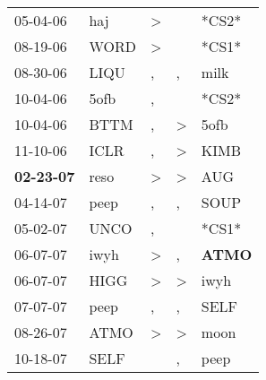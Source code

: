 \begin{supertabular}{p{0.07\textwidth}p{0.06\textwidth}p{0.02\textwidth}p{0.02\textwidth}p{0.06\textwidth}}
          05-04-06\textsuperscript{} &            haj\textsuperscript{} &     \textgreater &                  &                            *CS2* \\
          08-19-06\textsuperscript{} &           WORD\textsuperscript{} &     \textgreater &                  &                            *CS1* \\
          08-30-06\textsuperscript{} &           LIQU\textsuperscript{} &                , &                , &           milk\textsuperscript{} \\
          10-04-06\textsuperscript{} &           5ofb\textsuperscript{} &                , &                  &                            *CS2* \\
          10-04-06\textsuperscript{} &           BTTM\textsuperscript{} &                , &     \textgreater &           5ofb\textsuperscript{} \\
          11-10-06\textsuperscript{} &           ICLR\textsuperscript{} &                , &     \textgreater &           KIMB\textsuperscript{} \\
 \textbf{02-23-07\textsuperscript{}} &           reso\textsuperscript{} &     \textgreater &     \textgreater &            AUG\textsuperscript{} \\
          04-14-07\textsuperscript{} &           peep\textsuperscript{} &                , &                , &           SOUP\textsuperscript{} \\
          05-02-07\textsuperscript{} &           UNCO\textsuperscript{} &                , &                  &                            *CS1* \\
          06-07-07\textsuperscript{} &           iwyh\textsuperscript{} &     \textgreater &                , &  \textbf{ATMO\textsuperscript{}} \\
          06-07-07\textsuperscript{} &           HIGG\textsuperscript{} &     \textgreater &     \textgreater &           iwyh\textsuperscript{} \\
          07-07-07\textsuperscript{} &           peep\textsuperscript{} &                , &                , &           SELF\textsuperscript{} \\
          08-26-07\textsuperscript{} &           ATMO\textsuperscript{} &     \textgreater &     \textgreater &           moon\textsuperscript{} \\
          10-18-07\textsuperscript{} &           SELF\textsuperscript{} &                  &                , &           peep\textsuperscript{} \\

\end{supertabular}
